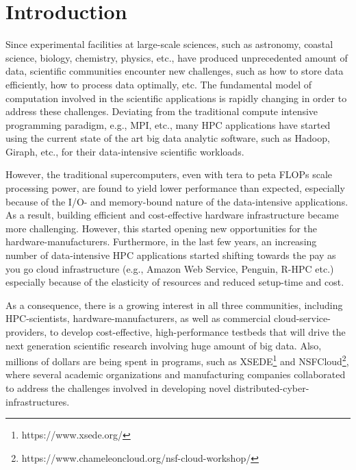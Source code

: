 \documentclass[conference]{IEEEtran}
\begin{document}

%
\IEEEpeerreviewmaketitle



\section {Introduction}
Since experimental facilities at large-scale sciences, such as astronomy, coastal science, biology, chemistry, physics, etc., have produced unprecedented amount of data, scientific communities encounter new challenges, such as how to store data efficiently, how to process data optimally, etc. The fundamental model of computation involved in the scientific applications is rapidly changing in order to address these challenges. Deviating from the traditional compute intensive programming paradigm, e.g., MPI, etc., many HPC applications have started using the current state of the art big data analytic software, such as Hadoop, Giraph, etc., for their data-intensive scientific workloads. 

However, the traditional supercomputers, even with tera to peta FLOPs scale processing power, are found to yield lower performance than expected, especially because of the I/O- and memory-bound nature of the data-intensive applications. As a result, building efficient and cost-effective hardware infrastructure became more challenging. However, this started opening new opportunities for the hardware-manufacturers. Furthermore, in the last few years, an increasing number of data-intensive HPC applications started shifting towards the pay as you go cloud infrastructure (e.g., Amazon Web Service, Penguin, R-HPC etc.) especially because of the elasticity of resources and reduced setup-time and cost. 

As a consequence, there is a growing interest in all three communities, including HPC-scientists, hardware-manufacturers, as well as commercial cloud-service-providers, to develop cost-effective, high-performance testbeds that will drive the next generation scientific research involving huge amount of big data. Also, millions of dollars are being spent in programs, such as XSEDE\footnote{https://www.xsede.org/} and NSFCloud\footnote{https://www.chameleoncloud.org/nsf-cloud-workshop/}, where several academic organizations and manufacturing companies collaborated to address the challenges involved in developing novel distributed-cyber-infrastructures. 
\end{document}
